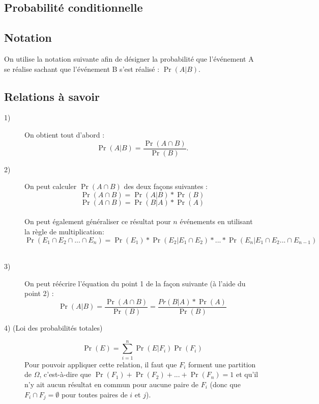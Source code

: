 \documentclass[10pt, french]{article}
\begin{document}
\begin{multicols*}{2}
\section{Probabilité conditionnelle}

\subsection{Notation}
\begin{distributions}[Notation]
On utilise la notation suivante afin de désigner la probabilité que l'événement A se réalise sachant que l'événement B s'est réalisé : $\Pr(A|B)$.
\end{distributions}

\subsection{Relations à savoir}
\begin{definitionNOHFILLprop}
\begin{description}
  \item[1)] On obtient tout d'abord :\\$$\Pr(A | B) = \frac{\Pr(A \cap B)}{\Pr(B)}.$$
  \item[2)] On peut calculer $\Pr(A \cap B)$ des deux façons suivantes :\\ $$\Pr(A \cap B) = \Pr(A | B)* \Pr(B)$$
  $$\Pr(A \cap B) = \Pr(B | A)* \Pr(A)$$\\On peut également généraliser ce résultat pour $n$ événements en utilisant la règle de multiplication:\\ $$\Pr(E_1 \cap E_2 \cap ... \cap E_n)= \Pr(E_1)* \Pr(E_2|E_1 \cap E_2)*... *\Pr(E_n|E_1 \cap E_2 ... \cap E_{n-1})$$\\
  \item[3)] On peut réécrire l'équation du point 1 de la façon suivante (à l'aide du point 2) : 
   $$\Pr(A | B) = \frac{\Pr(A \cap B)}{\Pr(B)} = \frac{Pr(B | A)* \Pr(A)}{\Pr(B)} $$ 
   \item[4) (Loi des probabilités totales)] $$\Pr(E) =	\sum_{i = 1}^{n} \Pr(E | F_{i}) \Pr(F_{i})$$
 Pour pouvoir appliquer cette relation, il faut que $F_i$ forment une partition de $\Omega$, c'est-à-dire que $\Pr(F_1) + \Pr(F_2) + ... + \Pr(F_n) = 1$ et qu'il n'y ait aucun résultat en commun pour aucune paire de $F_i$ (donc que $F_i \cap F_j = \emptyset $ pour toutes paires de $i$ et $j$).
\end{description}
\end{definitionNOHFILLprop}


\end{multicols*}
\end{document}
